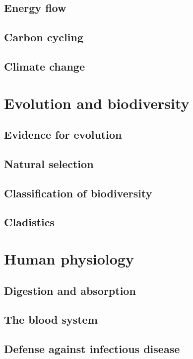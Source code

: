 \documentclass[12pt, a4paper]{article}
\begin{document}
\subsection{Energy flow}

\subsection{Carbon cycling}

\subsection{Climate change}


\newpage
\section{Evolution and biodiversity}
\subsection{Evidence for evolution}

\subsection{Natural selection}

\subsection{Classification of biodiversity}

\subsection{Cladistics}


\newpage
\section{Human physiology}
\subsection{Digestion and absorption}

\subsection{The blood system}

\subsection{Defense against infectious disease}
\end{document}
